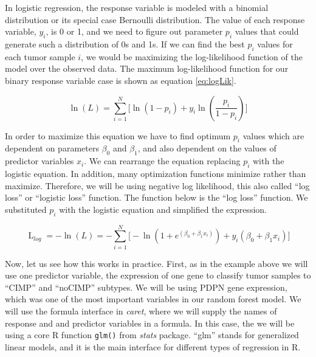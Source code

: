 \documentclass[12pt,]{krantz}
\begin{document}
In logistic regression, the response variable is modeled with a binomial distribution or its special case Bernoulli distribution. The value of each response variable, \(y_i\), is 0 or 1, and we need to figure out parameter \(p_i\) values that could generate such a distribution of 0s and 1s. If we can find the best \(p_i\) values for each tumor sample \(i\), we would be maximizing the log-likelihood function of the model over the observed data. The maximum log-likelihood function for our binary response variable case is shown as equation \eqref{eq:logLik}.

\begin{equation}
 \operatorname{\ln} (L)=\sum_{i=1}^N\bigg[{\ln(1-p_i)+y_i\ln \left({\frac {p_i}{1-p_i}}\right)\bigg]}
 \label{eq:logLik}
\end{equation}

In order to maximize this equation we have to find optimum \(p_i\) values which are dependent on parameters \(\beta_0\) and \(\beta_1\), and also dependent on the values of predictor variables \(x_i\). We can rearrange the equation replacing \(p_i\) with the logistic equation. In addition, many optimization functions minimize rather than maximize. Therefore, we will be using negative log likelihood, this also called ``log loss'' or ``logistic loss'' function. The function below is the ``log loss'' function. We substituted \(p_i\) with the logistic equation and simplified the expression.

\begin{equation}
\operatorname L_{log}=-{\ln}(L)=-\sum_{i=1}^N\bigg[-{\ln(1+e^{(\beta _{0}+\beta _{1}x_i)})+y_i \left(\beta _{0}+\beta _{1}x_i\right)\bigg]}
 \label{eq:llog}
\end{equation}

Now, let us see how this works in practice. First, as in the example above we will use one predictor variable, the expression of one gene to classify tumor samples to ``CIMP'' and ``noCIMP'' subtypes. We will be using PDPN gene expression, which was one of the most important variables in our random forest model. We will use the formula interface in \emph{caret}, where we will supply the names of response and and predictor variables in a formula. In this case, the we will be using a core R function \texttt{glm()} from \emph{stats} package. ``glm'' stands for generalized linear models, and it is the main interface for different types of regression
in R.
\end{document}
